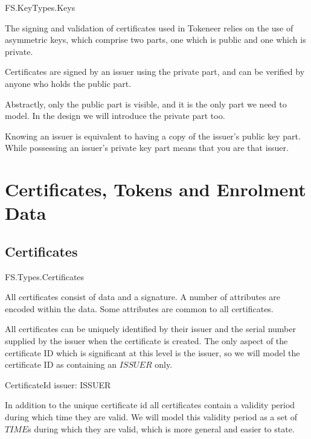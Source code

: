 \begin{traceunit}{FS.KeyTypes.Keys}
\end{traceunit}

The signing and validation of certificates used in Tokeneer relies on
the use of
asymmetric keys, which comprise two parts, one which is public and
one which is private. 
\begin{zed}
        [ KEYPART ]
\end{zed}

Certificates are signed by an issuer using the private part, and can
be verified by anyone who holds the public part. 

Abstractly, only the public part is visible,
and it is the only part we need to model. In the design we will
introduce the private part too.

Knowing an issuer is equivalent to having a copy of the issuer's
public key part. While possessing an issuer's private key part means 
that you are that issuer.
\section{Certificates, Tokens and Enrolment Data} 
\subsection{Certificates}

\begin{traceunit}{FS.Types.Certificates}
\end{traceunit}

All certificates consist of data and a signature. A number of
attributes are encoded within the data. Some attributes are common to
all certificates. 

All certificates can be uniquely identified by their issuer and the
serial number supplied by the issuer when the certificate is created.
The only aspect of the certificate ID which is significant at this 
level is the issuer, so we will model the certificate ID as containing
an $ISSUER$ only.
\begin{schema}{CertificateId}
	issuer: ISSUER
\end{schema}

In addition to the unique certificate id all certificates contain a
validity period during which time they are valid. We will model this
validity period as a set of $TIME$s during which they are valid,
which is more general and easier to state. 

